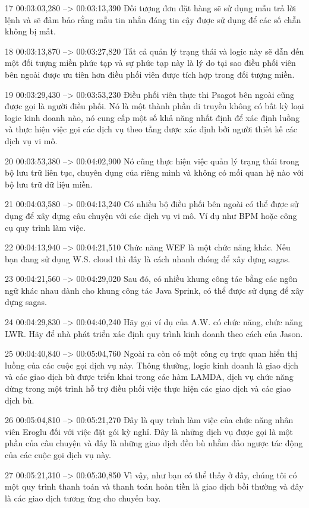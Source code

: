 17
00:03:03,280 --> 00:03:13,390
Đối tượng đơn đặt hàng sẽ sử dụng mẫu trả lời lệnh và sẽ đảm bảo rằng mẫu tin nhắn đáng tin cậy được sử dụng để các số chẵn không bị mất.

18
00:03:13,870 --> 00:03:27,820
Tất cả quản lý trạng thái và logic này sẽ dẫn đến một đối tượng miền phức tạp và sự phức tạp này là lý do tại sao điều phối viên bên ngoài được ưu tiên hơn điều phối viên được tích hợp trong đối tượng miền.

19
00:03:29,430 --> 00:03:53,230
Điều phối viên thực thi Psagot bên ngoài cũng được gọi là người điều phối.  Nó là một thành phần di truyền không có bất kỳ loại logic kinh doanh nào, nó cung cấp một số khả năng nhất định để xác định luồng và thực hiện việc gọi các dịch vụ theo tầng được xác định bởi người thiết kế các dịch vụ vi mô.

20
00:03:53,380 --> 00:04:02,900
Nó cũng thực hiện việc quản lý trạng thái trong bộ lưu trữ liên tục, chuyên dụng của riêng mình và không có mối quan hệ nào với bộ lưu trữ dữ liệu miền.

21
00:04:03,580 --> 00:04:13,240
Có nhiều bộ điều phối bên ngoài có thể được sử dụng để xây dựng câu chuyện với các dịch vụ vi mô.  Ví dụ như BPM hoặc công cụ quy trình làm việc.

22
00:04:13,940 --> 00:04:21,510
Chức năng WEF là một chức năng khác.  Nếu bạn đang sử dụng W.S.  cloud thì đây là cách nhanh chóng để xây dựng sagas.

23
00:04:21,560 --> 00:04:29,020
Sau đó, có nhiều khung công tác bằng các ngôn ngữ khác nhau dành cho khung công tác Java Sprink, có thể được sử dụng để xây dựng sagas.

24
00:04:29,830 --> 00:04:40,240
Hãy gọi ví dụ của A.W.  có chức năng, chức năng LWR.  Hãy để nhà phát triển xác định quy trình kinh doanh theo cách của Jason.

25
00:04:40,840 --> 00:05:04,760
Ngoài ra còn có một công cụ trực quan hiển thị luồng của các cuộc gọi dịch vụ này.  Thông thường, logic kinh doanh là giao dịch và các giao dịch bù được triển khai trong các hàm LAMDA, dịch vụ chức năng dừng trong một trình hỗ trợ điều phối việc thực hiện các giao dịch và các giao dịch bù.

26
00:05:04,810 --> 00:05:21,270
Đây là quy trình làm việc của chức năng nhân viên Eroglu đối với việc đặt gói kỳ nghỉ.  Đây là những dịch vụ được gọi là một phần của câu chuyện và đây là những giao dịch đền bù nhằm đảo ngược tác động của các cuộc gọi dịch vụ này.

27
00:05:21,310 --> 00:05:30,850
Vì vậy, như bạn có thể thấy ở đây, chúng tôi có một quy trình thanh toán và thanh toán hoàn tiền là giao dịch bồi thường và đây là các giao dịch tương ứng cho chuyến bay.

